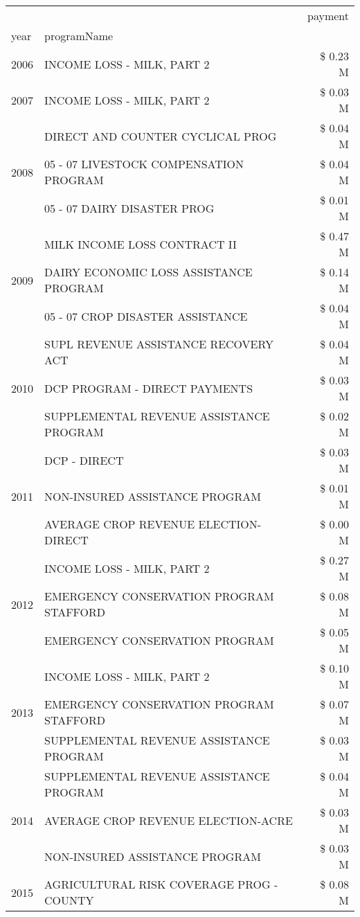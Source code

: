 \begin{tabular}{llr}
\toprule
 &  & payment \\
year & programName &  \\
\midrule
2006 & INCOME LOSS - MILK, PART 2 & \$ 0.23 M \\
\cline{1-3}
2007 & INCOME LOSS - MILK, PART 2 & \$ 0.03 M \\
\cline{1-3}
\multirow[t]{3}{*}{2008} & DIRECT AND COUNTER CYCLICAL PROG & \$ 0.04 M \\
 & 05 - 07 LIVESTOCK COMPENSATION PROGRAM & \$ 0.04 M \\
 & 05 - 07 DAIRY DISASTER PROG & \$ 0.01 M \\
\cline{1-3}
\multirow[t]{3}{*}{2009} & MILK INCOME LOSS CONTRACT II & \$ 0.47 M \\
 & DAIRY ECONOMIC LOSS ASSISTANCE PROGRAM & \$ 0.14 M \\
 & 05 - 07 CROP DISASTER ASSISTANCE & \$ 0.04 M \\
\cline{1-3}
\multirow[t]{3}{*}{2010} & SUPL REVENUE ASSISTANCE RECOVERY ACT & \$ 0.04 M \\
 & DCP PROGRAM - DIRECT PAYMENTS & \$ 0.03 M \\
 & SUPPLEMENTAL REVENUE ASSISTANCE PROGRAM & \$ 0.02 M \\
\cline{1-3}
\multirow[t]{3}{*}{2011} & DCP - DIRECT & \$ 0.03 M \\
 & NON-INSURED ASSISTANCE PROGRAM & \$ 0.01 M \\
 & AVERAGE CROP REVENUE ELECTION-DIRECT & \$ 0.00 M \\
\cline{1-3}
\multirow[t]{3}{*}{2012} & INCOME LOSS - MILK, PART 2 & \$ 0.27 M \\
 & EMERGENCY CONSERVATION PROGRAM STAFFORD & \$ 0.08 M \\
 & EMERGENCY CONSERVATION PROGRAM & \$ 0.05 M \\
\cline{1-3}
\multirow[t]{3}{*}{2013} & INCOME LOSS - MILK, PART 2 & \$ 0.10 M \\
 & EMERGENCY CONSERVATION PROGRAM STAFFORD & \$ 0.07 M \\
 & SUPPLEMENTAL REVENUE ASSISTANCE PROGRAM & \$ 0.03 M \\
\cline{1-3}
\multirow[t]{3}{*}{2014} & SUPPLEMENTAL REVENUE ASSISTANCE PROGRAM & \$ 0.04 M \\
 & AVERAGE CROP REVENUE ELECTION-ACRE & \$ 0.03 M \\
 & NON-INSURED ASSISTANCE PROGRAM & \$ 0.03 M \\
\cline{1-3}
\multirow[t]{3}{*}{2015} & AGRICULTURAL RISK COVERAGE PROG - COUNTY & \$ 0.08 M \\

\end{tabular}
